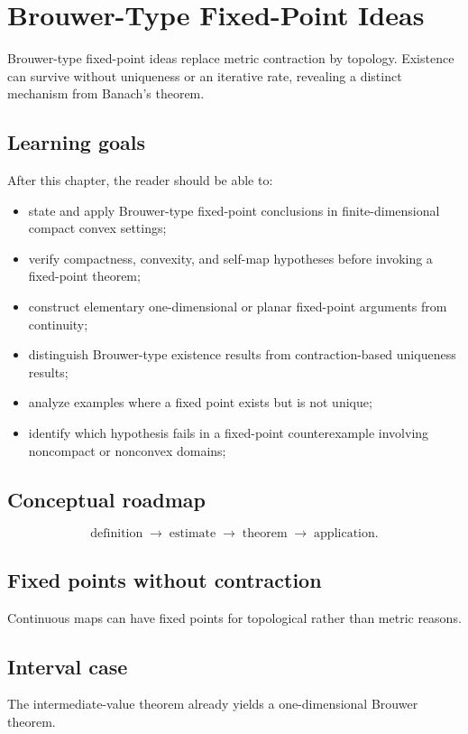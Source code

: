 \chapter{Brouwer-Type Fixed-Point Ideas}
\label{ch:ii17}

Brouwer-type fixed-point ideas replace metric contraction by topology. Existence can survive without uniqueness or an iterative rate, revealing a distinct mechanism from Banach's theorem.

\section*{Learning goals}
After this chapter, the reader should be able to:
\begin{itemize}
\item state and apply Brouwer-type fixed-point conclusions in finite-dimensional compact convex settings;
\item verify compactness, convexity, and self-map hypotheses before invoking a fixed-point theorem;
\item construct elementary one-dimensional or planar fixed-point arguments from continuity;
\item distinguish Brouwer-type existence results from contraction-based uniqueness results;
\item analyze examples where a fixed point exists but is not unique;
\item identify which hypothesis fails in a fixed-point counterexample involving noncompact or nonconvex domains;
\end{itemize}
\section*{Conceptual roadmap}
\[
\boxed{\text{definition}\;\longrightarrow\;\text{estimate}\;\longrightarrow\;\text{theorem}\;\longrightarrow\;\text{application}.}
\]

\section{Fixed points without contraction}
Continuous maps can have fixed points for topological rather than metric reasons.

\section{Interval case}
The intermediate-value theorem already yields a one-dimensional Brouwer theorem.

